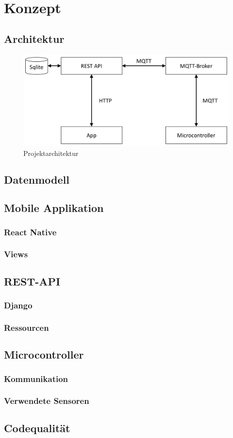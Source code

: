 \section{Konzept}

    \subsection{Architektur}
    \begin{figure}[H]
        \centering
        \includegraphics[width=0.7\linewidth]{../Pictures/Konzept/Architecture}
        \caption{Projektarchitektur}
        \label{fig:architecture}
    \end{figure}
    
    \subsection{Datenmodell}
    
    \subsection{Mobile Applikation}

        \subsubsection{React Native}
        \subsubsection{Views}

    \subsection{REST-API}

        \subsubsection{Django}
        \subsubsection{Ressourcen}

    \subsection{Microcontroller}

        \subsubsection{Kommunikation}
        \subsubsection{Verwendete Sensoren}

    \subsection{Codequalität}